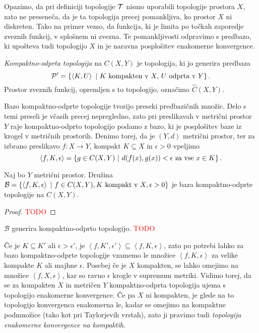 Opazimo, da pri definiciji topologije \(\mathcal{T}\) nismo uporabili topologije prostora $X$, zato ne preseneča, da je ta topologija precej pomankljiva, ko prostor $X$ ni diskreten. Tako na primer vemo, da funkcija, ki je limita po točkah zaporedje zveznih funkcij, v splošnem ni zvezna. Te pomankljivosti odpravimo s predbazo, ki upošteva tudi topologijo $X$ in je naravna posplošitev enakomerne konvergence.

\begin{definicija}
    \emph{Kompaktno-odprta topologija} na $C(X,Y)$ je topologija, ki jo generira predbaza \[\mathcal{P'} = \left\{\left\langle K, U \right\rangle \ | \ K \text{ kompakten v } X, \, U \text{ odprta v } Y\right\}.\]
    Prostor zveznih funkcij, opremljen s to topologijo, označimo $\widehat{C}(X,Y)$. 
\end{definicija}

Bazo kompaktno-odprte topologije tvorijo preseki predbazičnih množic. Delo s temi preseli je včasih precej nepregledno, zato pri preslikavah v metrični prostor $Y$ raje kompaktno-odprto topologijo podamo z bazo, ki je posplošitev baze iz krogel v metričnih prostorih. Denimo torej, da je $(Y, d)$ metrični prostor, ter za izbrano preslikavo $f: X \to Y$, kompakt \(K \subseteq X\) in $\epsilon > 0$ vpeljimo  
$$\left\langle f, K, \epsilon \right\rangle = \left\{g \in C(X, Y) \ | \ d(f(x), g(x)) < \epsilon \text{ za vse } x \in K\right\}.$$

\begin{trditev}
    Naj bo $Y$ metrični prostor. Družina $\mathcal{B} = \left\{\left\langle f, K, \epsilon \right\rangle \ | \ f \in C(X, Y), K \text{ kompakt v } X, \epsilon>0\right\}$ je baza kompaktno-odprte topologije na $C(X, Y)$.
\end{trditev}

\begin{proof}
    \textcolor{red}{TODO}
\end{proof}

\begin{opomba}
    \(\mathcal{B}\) generira kompaktno-odprto topologijo. \textcolor{red}{TODO}
\end{opomba}

Če je $K \subseteq K'$ ali $\epsilon > \epsilon'$, je $\left\langle f, K', \epsilon' \right\rangle \subseteq \left\langle f, K, \epsilon \right\rangle$, zato po potrebi lahko za bazo kompaktno-odprte topologije vzamemo le množice \(\left\langle f, K, \epsilon \right\rangle\) za velike kompakte $K$ ali majhne $\epsilon$. Posebej če je $X$ kompakten, se lahko omejimo na množice \(\left\langle f, X, \epsilon \right\rangle\), kar so ravno $\epsilon$ krogle v supremum metriki. Vidimo torej, da se za kompakten $X$ in metričen $Y$ kompaktno-odprta topologija ujema s topologijo enakomerne konvergence. Če pa $X$ ni kompakten, je glede na to topologijo konvergenca enakomerna le, kadar se omejimo na kompaktne podmnožice (tako kot pri Taylorjevih vrstah), zato ji pravimo tudi \emph{topologija enakomerne konvergence na kompaktih}.

